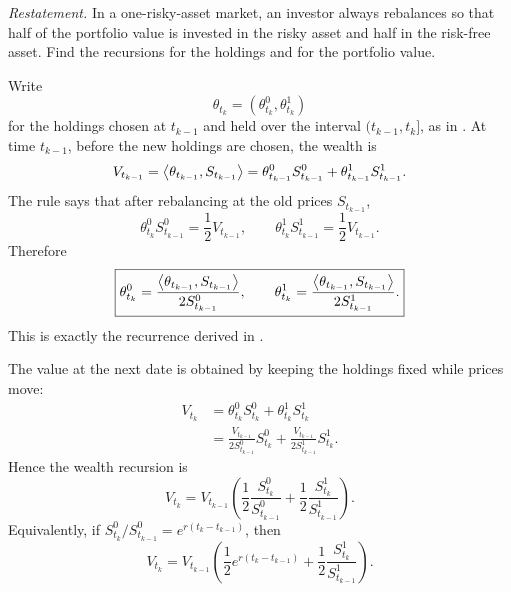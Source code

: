 \begin{exercise}
\emph{Restatement.}  In a one-risky-asset market, an investor always
rebalances so that half of the portfolio value is invested in the risky asset
and half in the risk-free asset.  Find the recursions for the holdings and for
the portfolio value.
\end{exercise}

\begin{solution}
Write
\[
  \theta_{t_k}=(\theta^0_{t_k},\theta^1_{t_k})
\]
for the holdings chosen at \(t_{k-1}\) and held over the interval
\((t_{k-1},t_k]\), as in .  At time \(t_{k-1}\), before the
new holdings are chosen, the wealth is
\[
  V_{t_{k-1}}=\left\langle \theta_{t_{k-1}},S_{t_{k-1}}\right\rangle
  =\theta^0_{t_{k-1}}S^0_{t_{k-1}}
   +\theta^1_{t_{k-1}}S^1_{t_{k-1}}.
\]
The rule says that after rebalancing at the old prices \(S_{t_{k-1}}\),
\[
  \theta^0_{t_k}S^0_{t_{k-1}}=\frac12 V_{t_{k-1}},
  \qquad
  \theta^1_{t_k}S^1_{t_{k-1}}=\frac12 V_{t_{k-1}}.
\]
Therefore
\[
  \boxed{
  \theta^0_{t_k}
    =\frac{\left\langle \theta_{t_{k-1}},S_{t_{k-1}}\right\rangle}
           {2S^0_{t_{k-1}}},
  \qquad
  \theta^1_{t_k}
    =\frac{\left\langle \theta_{t_{k-1}},S_{t_{k-1}}\right\rangle}
           {2S^1_{t_{k-1}}}.
  }
\]
This is exactly the recurrence derived in .

The value at the next date is obtained by keeping the holdings fixed while
prices move:
\[
\begin{aligned}
  V_{t_k}
    &=\theta^0_{t_k}S^0_{t_k}+\theta^1_{t_k}S^1_{t_k} \\
    &=\frac{V_{t_{k-1}}}{2S^0_{t_{k-1}}}S^0_{t_k}
      +\frac{V_{t_{k-1}}}{2S^1_{t_{k-1}}}S^1_{t_k}.
\end{aligned}
\]
Hence the wealth recursion is
\[
  \boxed{
  V_{t_k}
  =
  V_{t_{k-1}}
  \left(
    \frac12\frac{S^0_{t_k}}{S^0_{t_{k-1}}}
    +
    \frac12\frac{S^1_{t_k}}{S^1_{t_{k-1}}}
  \right).
  }
\]
Equivalently, if \(S^0_{t_k}/S^0_{t_{k-1}}=e^{r(t_k-t_{k-1})}\), then
\[
  V_{t_k}
  =
  V_{t_{k-1}}
  \left(
    \frac12 e^{r(t_k-t_{k-1})}
    +
    \frac12\frac{S^1_{t_k}}{S^1_{t_{k-1}}}
  \right).
\]
\end{solution}
